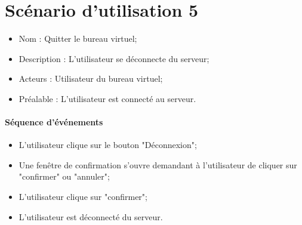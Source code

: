 \section{Scénario d'utilisation 5}
\begin{itemize}
	\item Nom : Quitter le bureau virtuel;
	\item Description : L'utilisateur se déconnecte du serveur;
	\item Acteurs : Utilisateur du bureau virtuel;
	\item Préalable : L'utilisateur est connecté  au serveur.
\end{itemize}

\paragraph{Séquence d'événements}
\begin{itemize}
	\item L'utilisateur clique sur le bouton "Déconnexion";
	\item Une fenêtre de confirmation s'ouvre demandant à l'utilisateur de cliquer sur "confirmer" ou "annuler";
	\item L'utilisateur clique sur "confirmer";
	\item L'utilisateur est déconnecté du serveur.
\end{itemize}

